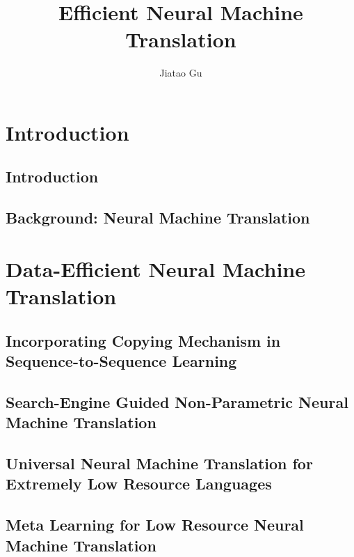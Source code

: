 \documentclass[a4paper,12pt,twoside]{book}
\begin{document}
\title{Efficient Neural Machine Translation}
\author{Jiatao Gu}

\beforepreface




\afterpreface

\part{Introduction}
\chapter{Introduction}
\label{intro}


\chapter[Background]{Background: Neural Machine Translation}
\label{background}


\part{Data-Efficient Neural Machine Translation}
\chapter[Copying Mechanism]{Incorporating Copying Mechanism in Sequence-to-Sequence Learning}
\label{copy}


\chapter[Non-Parametric Neural Machine Translation]{Search-Engine Guided Non-Parametric Neural Machine Translation}
\label{seg-nmt}


\chapter[Universal Neural Machine Translation]{Universal Neural Machine Translation for Extremely Low Resource Languages}
\label{ulr}


\chapter[Meta Learning for Neural Machine Translation]{Meta Learning for Low Resource Neural Machine Translation}
\label{MetaNMT}

\end{document}
